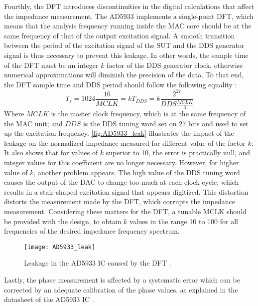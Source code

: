 Fourthly, the DFT introduces discontinuities in the digital calculations that affect the impedance measurement. The AD5933 implements a single-point DFT, which means that the analysis frequency running inside the MAC core should be at the same frequency of that of the output excitation signal. A smooth transition between the period of the excitation signal of the SUT and the DDS generator signal is thus necessary to prevent this leakage. In other words, the sample time of the DFT must be an integer $k$ factor of the DDS generator clock, otherwise numerical approximations will diminish the precision of the data. To that end, the DFT sample time and DDS period should follow the following equality \cite{Chabowski2015}:
\begin{equation}
   T_s = 1024 \frac{16}{MCLK} = k T_{DDS} = k \frac{2^{27}}{DDS \frac{MCLK}{4}}
\end{equation}
Where $MCLK$ is the master clock frequency, which is at the same frequency of the MAC unit; and $DDS$ is the DDS tuning word set on 27 bits and used to set up the excitation frequency. \autoref{fig:AD5933_leak} illustrates the impact of the leakage on the normalized impedance measured for different value of the factor $k$. It also shows that for values of $k$ superior to 10, the error is practically null, and integer values for this coefficient are no longer necessary. However, for higher value of $k$, another problem appears. The high value of the DDS tuning word causes the output of the DAC to change too much at each clock cycle, which results in a stair-shaped excitation signal that appears digitized. This distortion distorts the measurement made by the DFT, which corrupts the impedance measurement. Considering these matters for the DFT, a tunable MCLK should be provided with the design, to obtain $k$ values in the range 10 to 100 for all frequencies of the desired impedance frequency spectrum. \cite{Chabowski2015} \par
\begin{figure}[h]
    \centering
    \texttt{[image: AD5933\_leak]}
    \caption{Leakage in the AD5933 IC caused by the DFT \cite{Chabowski2015}.}
    \label{fig:AD5933_leak}
\end{figure}

Lastly, the phase measurement is affected by a systematic error which can be corrected by an adequate calibration of the phase values\cite{Chabowski2015}, as explained in the datasheet of the AD5933 IC \cite{AD5933-documentation}.\par

